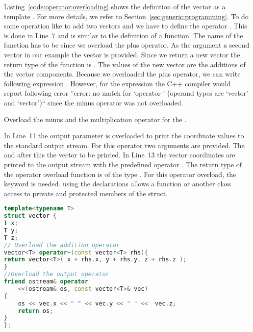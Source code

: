 Listing~\ref{code:operator:overloading} shows the definition of the  vector as a template . For more details, we refer to Section~\ref{sec:generic:programming}. To do some operation like to add two vectors  and  we have to define the operator \cpp{+}. This is done in Line~7 and is similar to the definition of a function. The name of the function has to be  since we overload the plus operator. As the argument a second vector  in our example the vector  is provided. Since we return a new vector the return type of the function is . The values of the new vector are the additions of the vector components. Because we overloaded the plus operator, we can write following expression . However, for the expression  the C++ compiler would report following error ''error: no match for ‘operator-’ (operand types are ‘vector’ and ‘vector’)`` since the minus operator was not overloaded.

\begin{exercise}
Overload the minus and the multiplication operator for the .
\end{exercise}

In Line~11 the output parameter \cpp{<<} is overloaded to print the coordinate values to the standard output stream. For this operator two arguments are provided. The  and after this the vector to be printed. In Line~13 the vector coordinates are printed to the output stream with the predefined operator \cpp{<<}. The return type of the operator overload function is of the type . For this operator overload, the keyword  is needed. using the  declarations allows a function or another class access to private and protected members of the struct.

\begin{lstlisting}[language=c++,caption={Example for the operator overload for the plus operator and the output operator.\label{code:operator:overloading}},float,floatplacement=tb]
template<typename T>
struct vector {
T x;
T y;
T z;
// Overload the addition operator
vector<T> operator+(const vector<T> rhs){
return vector<T>( x + rhs.x, y + rhs.y, z + rhs.z );
}
//Overload the output operator
friend ostream& operator
	<<(ostream& os, const vector<T>& vec)
{
    os << vec.x << " " << vec.y << " " <<  vec.z;
    return os;
}
};
\end{lstlisting}


